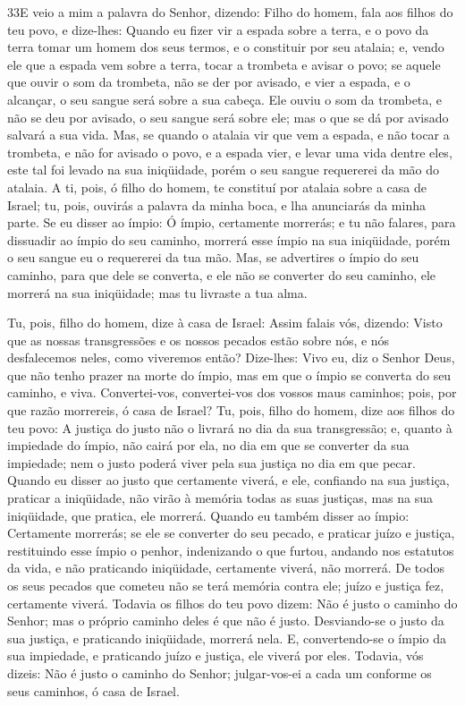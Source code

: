 \medskip

\lettrine{33} E veio a mim a palavra do Senhor, dizendo:
Filho do homem, fala aos filhos do teu povo, e dize-lhes: Quando
eu fizer vir a espada sobre a terra, e o povo da terra tomar um
homem dos seus termos, e o constituir por seu atalaia; e, vendo
ele que a espada vem sobre a terra, tocar a trombeta e avisar o
povo; se aquele que ouvir o som da trombeta, não se der por
avisado, e vier a espada, e o alcançar, o seu sangue será sobre a
sua cabeça. Ele ouviu o som da trombeta, e não se deu por
avisado, o seu sangue será sobre ele; mas o que se dá por avisado
salvará a sua vida. Mas, se quando o atalaia vir que vem a
espada, e não tocar a trombeta, e não for avisado o povo, e a espada
vier, e levar uma vida dentre eles, este tal foi levado na sua
iniqüidade, porém o seu sangue requererei da mão do atalaia. A
ti, pois, ó filho do homem, te constituí por atalaia sobre a casa de
Israel; tu, pois, ouvirás a palavra da minha boca, e lha anunciarás
da minha parte. Se eu disser ao ímpio: Ó ímpio, certamente
morrerás; e tu não falares, para dissuadir ao ímpio do seu caminho,
morrerá esse ímpio na sua iniqüidade, porém o seu sangue eu o
requererei da tua mão. Mas, se advertires o ímpio do seu
caminho, para que dele se converta, e ele não se converter do seu
caminho, ele morrerá na sua iniqüidade; mas tu livraste a tua alma.

Tu, pois, filho do homem, dize à casa de Israel: Assim falais
vós, dizendo: Visto que as nossas transgressões e os nossos pecados
estão sobre nós, e nós desfalecemos neles, como viveremos então?
Dize-lhes: Vivo eu, diz o Senhor Deus, que não tenho prazer
na morte do ímpio, mas em que o ímpio se converta do seu caminho, e
viva. Convertei-vos, convertei-vos dos vossos maus caminhos; pois,
por que razão morrereis, ó casa de Israel? Tu, pois, filho do
homem, dize aos filhos do teu povo: A justiça do justo não o livrará
no dia da sua transgressão; e, quanto à impiedade do ímpio, não
cairá por ela, no dia em que se converter da sua impiedade; nem o
justo poderá viver pela sua justiça no dia em que pecar.
Quando eu disser ao justo que certamente viverá, e ele,
confiando na sua justiça, praticar a iniqüidade, não virão à memória
todas as suas justiças, mas na sua iniqüidade, que pratica, ele
morrerá. Quando eu também disser ao ímpio: Certamente
morrerás; se ele se converter do seu pecado, e praticar juízo e
justiça, restituindo esse ímpio o penhor, indenizando o que
furtou, andando nos estatutos da vida, e não praticando iniqüidade,
certamente viverá, não morrerá. De todos os seus pecados que
cometeu não se terá memória contra ele; juízo e justiça fez,
certamente viverá. Todavia os filhos do teu povo dizem: Não é
justo o caminho do Senhor; mas o próprio caminho deles é que não é
justo. Desviando-se o justo da sua justiça, e praticando
iniqüidade, morrerá nela. E, convertendo-se o ímpio da sua
impiedade, e praticando juízo e justiça, ele viverá por eles.
Todavia, vós dizeis: Não é justo o caminho do Senhor;
julgar-vos-ei a cada um conforme os seus caminhos, ó casa de Israel.

